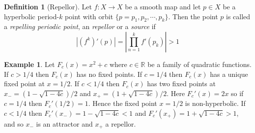 \documentclass[11pt,a4paper,oneside]{memoir}
\theoremstyle{plain}
\theoremstyle{definition}
\newtheorem{defn}[thm]{Definition}
\newtheorem{exmp}[thm]{Example}
\begin{document}
\begin{defn}[Repellor] \label{def:repellor}
    Let $f: X \to X$ be a smooth map and let $p \in X$ be a hyperbolic period-$k$ point with orbit $\lbrace p = p_1, p_2, \cdots, p_k \rbrace$. Then the point $p$ is called a \emph{repelling periodic point}, an \emph{repellor} or a \emph{source} if \[|(f^k)'(p)| = \left\lvert \prod_{n = 1}^k f'(p_k) \right\rvert > 1\]
\end{defn}

\begin{exmp}
    Let $F_c(x) = x^2 + c$ where $c \in \mathbb{R}$ be a family of quadratic functions. If $c > 1/4$ then $F_c(x)$ has no fixed points. If $c = 1/4$ then $F_c(x)$ has a unique fixed point at $x = 1/2$. If $c < 1/4$ then $F_c(x)$ has two fixed points at $x_- = (1 - \sqrt{1 - 4c}) / 2$ and $x_+ = (1 + \sqrt{1 - 4c}) / 2$. Here $F_c'(x) = 2x$ so if $c = 1/4$ then $F_c'(1/2) = 1$. Hence the fixed point $x = 1/2$ is non-hyperbolic. If $c < 1/4$ then $F_c'(x_-) = 1 - \sqrt{1 - 4c} < 1$ and $F_c'(x_+) = 1 + \sqrt{1 - 4c} > 1$, and so $x_-$ is an attractor and $x_+$ a repellor.
\end{exmp}
\end{document}
